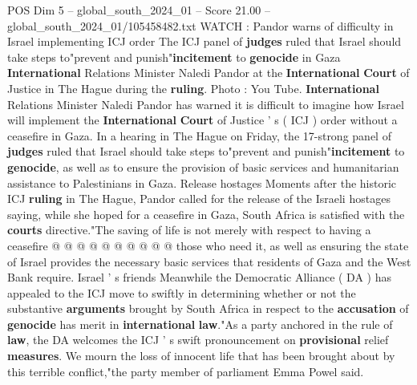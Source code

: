 \begin{textsample}{POS Dim 5 – global\_south\_2024\_01 – Score 21.00 – global\_south\_2024\_01/105458482.txt}  \label{ex:f5_pos_012}
WATCH : Pandor warns of difficulty in Israel implementing ICJ order The ICJ panel of \textbf{judges} ruled that Israel should take steps to"prevent and punish"\textbf{incitement} to \textbf{genocide} in Gaza \textbf{International} Relations Minister Naledi Pandor at the \textbf{International} \textbf{Court} of Justice in The Hague during the \textbf{ruling}.
Photo : You Tube. \textbf{International} Relations Minister Naledi Pandor has warned it is difficult to imagine how Israel will implement the \textbf{International} \textbf{Court} of Justice ' s ( ICJ ) order without a ceasefire in Gaza.
In a hearing in The Hague on Friday, the 17-strong panel of \textbf{judges} ruled that Israel should take steps to"prevent and punish"\textbf{incitement} to \textbf{genocide}, as well as to ensure the provision of basic services and humanitarian assistance to Palestinians in Gaza.
Release hostages Moments after the historic ICJ \textbf{ruling} in The Hague, Pandor called for the release of the Israeli hostages saying, while she hoped for a ceasefire in Gaza, South Africa is satisfied with the \textbf{courts} directive."The saving of life is not merely with respect to having a ceasefire @ @ @ @ @ @ @ @ @ @ those who need it, as well as ensuring the state of Israel provides the necessary basic services that residents of Gaza and the West Bank require.
Israel ' s friends Meanwhile the Democratic Alliance ( DA ) has appealed to the ICJ move to swiftly in determining whether or not the substantive \textbf{arguments} brought by South Africa in respect to the \textbf{accusation} of \textbf{genocide} has merit in \textbf{international} \textbf{law}."As a party anchored in the rule of \textbf{law}, the DA welcomes the ICJ ' s swift pronouncement on \textbf{provisional} relief \textbf{measures}.
We mourn the loss of innocent life that has been brought about by this terrible conflict,"the party member of parliament Emma Powel said.

\end{textsample}
